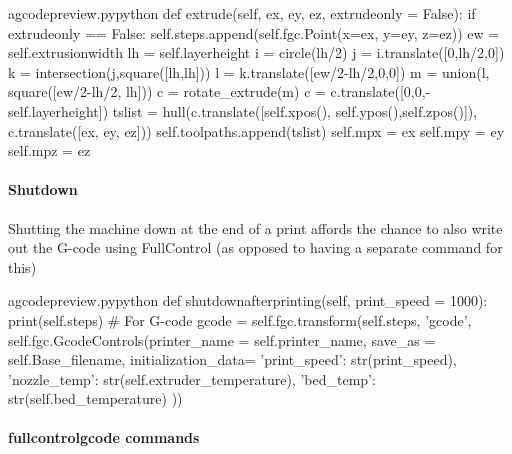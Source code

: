 \documentclass{ltxdoc}
\begin{document}
\lstset{firstnumber=\thegcpy}
\begin{writecode}{a}{gcodepreview.py}{python}
    def extrude(self, ex, ey, ez, extrudeonly = False):
        if extrudeonly == False:
            self.steps.append(self.fgc.Point(x=ex, y=ey, z=ez))
        ew = self.extrusionwidth
        lh = self.layerheight
        i = circle(lh/2)
        j = i.translate([0,lh/2,0])
        k = intersection(j,square([lh,lh]))
        l = k.translate([ew/2-lh/2,0,0])
        m = union(l, square([ew/2-lh/2, lh]))
        c = rotate_extrude(m)
        c = c.translate([0,0,-self.layerheight])
        tslist = hull(c.translate([self.xpos(), self.ypos(),self.zpos()]), c.translate([ex, ey, ez]))
        self.toolpaths.append(tslist)
        self.mpx = ex
        self.mpy = ey
        self.mpz = ez

\end{writecode}
\addtocounter{gcpy}{18}

\paragraph{Shutdown}

Shutting the machine down at the end of a print affords the chance to also write out the G-code using FullControl (as opposed to having a separate command for this)

\lstset{firstnumber=\thegcpy}
\begin{writecode}{a}{gcodepreview.py}{python}
    def shutdownafterprinting(self, print_speed = 1000):
        print(self.steps)
# For G-code
        gcode = self.fgc.transform(self.steps, 'gcode', 
                             self.fgc.GcodeControls(printer_name = self.printer_name, 
                             save_as = self.Base_filename,
                             initialization_data={
                                 'print_speed': str(print_speed),
                                 'nozzle_temp': str(self.extruder_temperature),
                                 'bed_temp': str(self.bed_temperature)
                             }
                             )) 

\end{writecode}
\addtocounter{gcpy}{13}


\paragraph{fullcontrolgcode commands}
\end{document}

